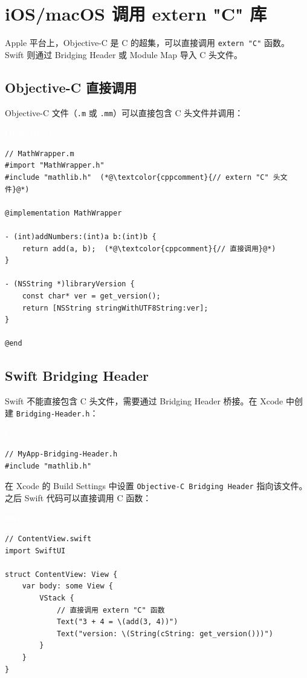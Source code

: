 \documentclass[12pt,a4paper,fontset=fandol]{ctexbook}
\newcommand{\clabel}{%
  \begin{tcolorbox}[enhanced,colback=cheadbg,colframe=cheadbg,
    arc=1mm,boxrule=0mm,left=6pt,right=6pt,top=2pt,bottom=2pt,
    halign=left,oversize]
    \textcolor{white}{\small\bfseries C}
  \end{tcolorbox}\vspace{-4pt}}
\newcommand{\objclabel}{%
  \begin{tcolorbox}[enhanced,colback=objcheadbg,colframe=objcheadbg,
    arc=1mm,boxrule=0mm,left=6pt,right=6pt,top=2pt,bottom=2pt,
    halign=left,oversize]
    \textcolor{white}{\small\bfseries Objective-C}
  \end{tcolorbox}\vspace{-4pt}}
\newcommand{\swiftlabel}{%
  \begin{tcolorbox}[enhanced,colback=swiftheadbg,colframe=swiftheadbg,
    arc=1mm,boxrule=0mm,left=6pt,right=6pt,top=2pt,bottom=2pt,
    halign=left,oversize]
    \textcolor{white}{\small\bfseries Swift}
  \end{tcolorbox}\vspace{-4pt}}
\begin{document}
\section{iOS/macOS 调用 extern "C" 库}

Apple 平台上，Objective-C 是 C 的超集，可以直接调用 \texttt{extern "C"} 函数。
Swift 则通过 Bridging Header 或 Module Map 导入 C 头文件。

\subsection{Objective-C 直接调用}

Objective-C 文件（\texttt{.m} 或 \texttt{.mm}）可以直接包含 C 头文件并调用：

\objclabel
\begin{lstlisting}[style=cstyle]
// MathWrapper.m
#import "MathWrapper.h"
#include "mathlib.h"  (*@\textcolor{cppcomment}{// extern "C" 头文件}@*)

@implementation MathWrapper

- (int)addNumbers:(int)a b:(int)b {
    return add(a, b);  (*@\textcolor{cppcomment}{// 直接调用}@*)
}

- (NSString *)libraryVersion {
    const char* ver = get_version();
    return [NSString stringWithUTF8String:ver];
}

@end
\end{lstlisting}

\subsection{Swift Bridging Header}

Swift 不能直接包含 C 头文件，需要通过 Bridging Header 桥接。在 Xcode 中创建 \texttt{Bridging-Header.h}：

\clabel
\begin{lstlisting}[style=cstyle]
// MyApp-Bridging-Header.h
#include "mathlib.h"
\end{lstlisting}

在 Xcode 的 Build Settings 中设置 \texttt{Objective-C Bridging Header} 指向该文件。之后 Swift 代码可以直接调用 C 函数：

\swiftlabel
\begin{lstlisting}[style=cppstyle]
// ContentView.swift
import SwiftUI

struct ContentView: View {
    var body: some View {
        VStack {
            // 直接调用 extern "C" 函数
            Text("3 + 4 = \(add(3, 4))")
            Text("version: \(String(cString: get_version()))")
        }
    }
}
\end{lstlisting}
\end{document}
